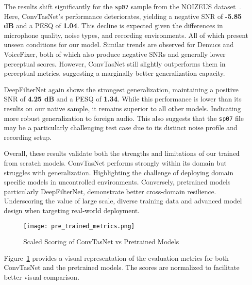The results shift significantly for the \texttt{sp07} sample from the NOIZEUS dataset~\cite{hu2007subjective}. Here, ConvTasNet's performance deteriorates, yielding a negative SNR of \textbf{-5.85 dB} and a PESQ of \textbf{1.04}. This decline is expected given the differences in microphone quality, noise types, and recording environments. All of which present unseen conditions for our model. Similar trends are observed for Demucs and VoiceFixer, both of which also produce negative SNRs and generally lower perceptual scores. However, ConvTasNet still slightly outperforms them in perceptual metrics, suggesting a marginally better generalization capacity.

DeepFilterNet again shows the strongest generalization, maintaining a positive SNR of \textbf{4.25 dB} and a PESQ of \textbf{1.34}. While this performance is lower than its results on our native sample, it remains superior to all other models. Indicating more robust generalization to foreign audio. This also suggests that the \texttt{sp07} file may be a particularly challenging test case due to its distinct noise profile and recording setup.

Overall, these results validate both the strengths and limitations of our trained from scratch models. ConvTasNet performs strongly within its domain but struggles with generalization. Highlighting the challenge of deploying domain specific models in uncontrolled environments. Conversely, pretrained models particularly DeepFilterNet, demonstrate better cross-domain resilience. Underscoring the value of large scale, diverse training data and advanced model design when targeting real-world deployment.

\begin{figure}[H]
\centering
\texttt{[image: pre\_trained\_metrics.png]}
\caption{Scaled Scoring of ConvTasNet vs Pretrained Models}
\label{fig:pretrained_metrics}
\end{figure}
\noindent

Figure~\ref{fig:pretrained_metrics} provides a visual representation of the evaluation metrics for both ConvTasNet and the pretrained models. The scores are normalized to facilitate better visual comparison.

